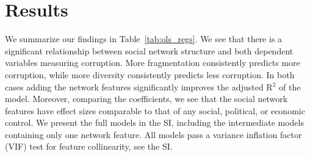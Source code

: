 \section{Results}
We summarize our findings in Table~\ref{tab:ols_regs}. We see that there is a significant relationship between social network structure and both dependent variables measuring corruption. More fragmentation consistently predicts more corruption, while more diversity consistently predicts less corruption. In both cases adding the network features significantly improves the adjusted R$^{2}$ of the model. Moreover, comparing the coefficients, we see that the social network features have effect sizes comparable to that of any social, political, or economic control. We present the full models in the SI, including the intermediate models containing only one network feature. All models pass a variance inflation factor (VIF) test for feature collinearity, see the SI.

